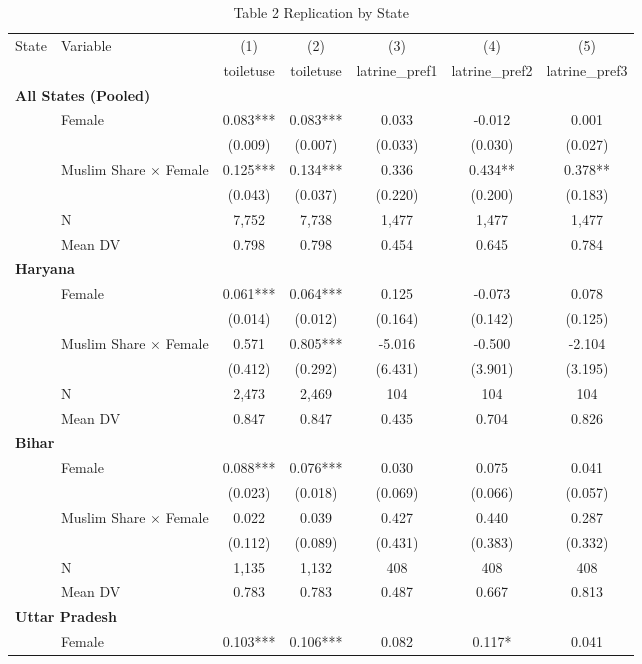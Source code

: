 \begin{table}[htbp]
\centering
\caption{Table 2 Replication by State}
\label{tab:table2_by_state}
\small
\begin{tabular}{llccccc}
\hline\hline
State & Variable & (1) & (2) & (3) & (4) & (5) \\
 &  & toiletuse & toiletuse & latrine\_pref1 & latrine\_pref2 & latrine\_pref3 \\
\hline
\multicolumn{7}{l}{\textbf{All States (Pooled)}} \\
 & Female & 0.083*** & 0.083*** & 0.033 & -0.012 & 0.001 \\
 &  & (0.009) & (0.007) & (0.033) & (0.030) & (0.027) \\
 & Muslim Share $\times$ Female & 0.125*** & 0.134*** & 0.336 & 0.434** & 0.378** \\
 &  & (0.043) & (0.037) & (0.220) & (0.200) & (0.183) \\
 & N & 7,752 & 7,738 & 1,477 & 1,477 & 1,477 \\
 & Mean DV & 0.798 & 0.798 & 0.454 & 0.645 & 0.784 \\
\hline
\multicolumn{7}{l}{\textbf{Haryana}} \\
 & Female & 0.061*** & 0.064*** & 0.125 & -0.073 & 0.078 \\
 &  & (0.014) & (0.012) & (0.164) & (0.142) & (0.125) \\
 & Muslim Share $\times$ Female & 0.571 & 0.805*** & -5.016 & -0.500 & -2.104 \\
 &  & (0.412) & (0.292) & (6.431) & (3.901) & (3.195) \\
 & N & 2,473 & 2,469 & 104 & 104 & 104 \\
 & Mean DV & 0.847 & 0.847 & 0.435 & 0.704 & 0.826 \\
\hline
\multicolumn{7}{l}{\textbf{Bihar}} \\
 & Female & 0.088*** & 0.076*** & 0.030 & 0.075 & 0.041 \\
 &  & (0.023) & (0.018) & (0.069) & (0.066) & (0.057) \\
 & Muslim Share $\times$ Female & 0.022 & 0.039 & 0.427 & 0.440 & 0.287 \\
 &  & (0.112) & (0.089) & (0.431) & (0.383) & (0.332) \\
 & N & 1,135 & 1,132 & 408 & 408 & 408 \\
 & Mean DV & 0.783 & 0.783 & 0.487 & 0.667 & 0.813 \\
\hline
\multicolumn{7}{l}{\textbf{Uttar Pradesh}} \\
 & Female & 0.103*** & 0.106*** & 0.082 & 0.117* & 0.041 \\

\end{tabular}
\end{table}
